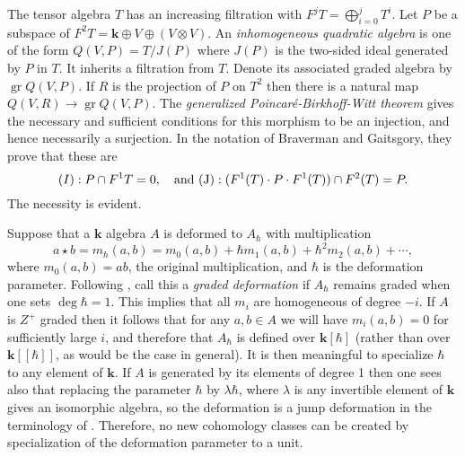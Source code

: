\documentclass{amsart}
\begin{document}
The tensor algebra $T$ has an increasing filtration with $F^jT = \bigoplus_{i=0}^j T^i$.  Let $P$ be a subspace of $F^2T = {\ensuremath{\mathbf{k}}}\oplus V \oplus (V\otimes V)$. An \emph{inhomogeneous quadratic algebra} is one of the form $Q(V, P) = T/J(P)$  where  $J(P)$ is the two-sided ideal generated by $P$ in $T$.  It inherits a filtration from $T$. Denote its associated graded algebra by ${\operatorname{gr}} Q(V,P)$.  If $R$ is the projection of $P$ on $T^2$ then there is a natural map $Q(V,R) \to {\operatorname{gr}} Q(V,P)$.  The \emph{generalized Poincar{\'e}-Birkhoff-Witt theorem} gives the necessary and sufficient conditions for this morphism to be an injection, and hence necessarily a surjection. In the notation of Braverman and Gaitsgory, they prove that these are  
$$ \text(I): P\cap F^1T = 0, \quad \text{and (J)}: (F^1(T)\cdot P \cdot F^1(T)) \cap F^2(T) = P.$$
The necessity is evident. 

Suppose that a ${\ensuremath{\mathbf{k}}}$ algebra $A$ is deformed to $A_{\hbar}$ with multiplication 
\begin{equation} \label{star}
 a\star b = m_{\hbar}(a,b) = m_0(a,b) + \hbar m_1(a,b) + \hbar^2m_2(a,b) + \cdots,
 \end{equation}
 where $m_0(a,b) = ab$, the original multiplication, and $\hbar$ is the deformation parameter. Following \cite{BravermanGaitsgory:PBW}, call this a \emph{graded deformation} if $A_{\hbar}$ remains graded when one sets $\deg \hbar = 1$. This implies that all $m_i$ are homogeneous of degree $-i$.  If $A$ is $Z^+$ graded then it follows that for any $a,b \in A$ we will have $m_i(a,b) = 0$ for sufficiently large $i$, and therefore that $A_{\hbar}$ is defined over ${\ensuremath{\mathbf{k}}}[\hbar]$ (rather than over ${\ensuremath{\mathbf{k}}}[[\hbar]]$, as would be the  case in general). It is then meaningful to specialize $\hbar$ to any element of ${\ensuremath{\mathbf{k}}}$.  If $A$ is generated by its elements of degree 1 then one sees also that replacing the parameter $\hbar$ by $\lambda\hbar$, where $\lambda$ is any invertible element of ${\ensuremath{\mathbf{k}}}$ gives an isomorphic algebra, so the deformation is a jump deformation in the terminology of \cite{G:Def4}. Therefore, no new cohomology classes can be created by specialization of the deformation parameter to a unit.
\end{document}
